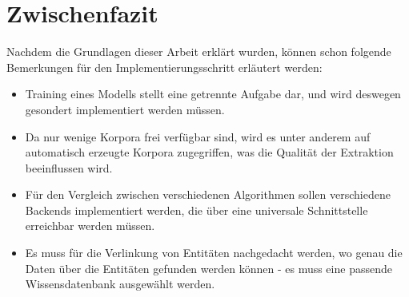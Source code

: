 \section{Zwischenfazit}
Nachdem die Grundlagen dieser Arbeit erklärt wurden, können schon folgende Bemerkungen für den Implementierungsschritt erläutert werden:
\begin{itemize}
\item Training eines Modells stellt eine getrennte Aufgabe dar, und wird deswegen gesondert implementiert werden müssen.
\item Da nur wenige Korpora frei verfügbar sind, wird es unter anderem auf automatisch erzeugte Korpora zugegriffen, was die Qualität der Extraktion beeinflussen wird.
\item Für den Vergleich zwischen verschiedenen Algorithmen sollen verschiedene Backends implementiert werden, die über eine universale Schnittstelle erreichbar werden müssen.
\item Es muss für die Verlinkung von Entitäten nachgedacht werden, wo genau die Daten über die Entitäten gefunden werden können - es muss eine passende Wissensdatenbank ausgewählt werden.
\end{itemize}
